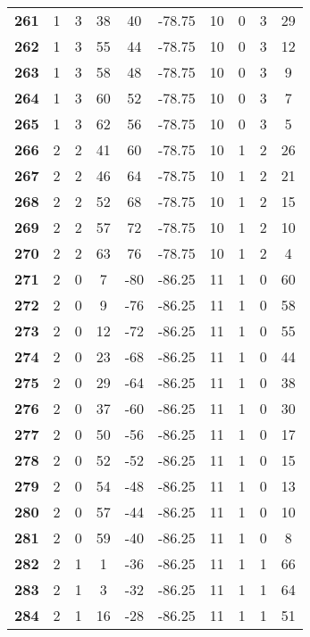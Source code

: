 \documentclass{article}%
\begin{document}
\begin{longtable}{cccccccccc}
        \textbf{261} & 1 & 3 & 38 & 40 & -78.75 & 10 & 0 & 3 & 29 \\ 
        \textbf{262} & 1 & 3 & 55 & 44 & -78.75 & 10 & 0 & 3 & 12 \\ 
        \textbf{263} & 1 & 3 & 58 & 48 & -78.75 & 10 & 0 & 3 & 9 \\ 
        \textbf{264} & 1 & 3 & 60 & 52 & -78.75 & 10 & 0 & 3 & 7 \\ 
        \textbf{265} & 1 & 3 & 62 & 56 & -78.75 & 10 & 0 & 3 & 5 \\ 
        \textbf{266} & 2 & 2 & 41 & 60 & -78.75 & 10 & 1 & 2 & 26 \\ 
        \textbf{267} & 2 & 2 & 46 & 64 & -78.75 & 10 & 1 & 2 & 21 \\ 
        \textbf{268} & 2 & 2 & 52 & 68 & -78.75 & 10 & 1 & 2 & 15 \\ 
        \textbf{269} & 2 & 2 & 57 & 72 & -78.75 & 10 & 1 & 2 & 10 \\ 
        \textbf{270} & 2 & 2 & 63 & 76 & -78.75 & 10 & 1 & 2 & 4 \\ 
        \textbf{271} & 2 & 0 & 7 & -80 & -86.25 & 11 & 1 & 0 & 60 \\ 
        \textbf{272} & 2 & 0 & 9 & -76 & -86.25 & 11 & 1 & 0 & 58 \\ 
        \textbf{273} & 2 & 0 & 12 & -72 & -86.25 & 11 & 1 & 0 & 55 \\ 
        \textbf{274} & 2 & 0 & 23 & -68 & -86.25 & 11 & 1 & 0 & 44 \\ 
        \textbf{275} & 2 & 0 & 29 & -64 & -86.25 & 11 & 1 & 0 & 38 \\ 
        \textbf{276} & 2 & 0 & 37 & -60 & -86.25 & 11 & 1 & 0 & 30 \\ 
        \textbf{277} & 2 & 0 & 50 & -56 & -86.25 & 11 & 1 & 0 & 17 \\ 
        \textbf{278} & 2 & 0 & 52 & -52 & -86.25 & 11 & 1 & 0 & 15 \\ 
        \textbf{279} & 2 & 0 & 54 & -48 & -86.25 & 11 & 1 & 0 & 13 \\ 
        \textbf{280} & 2 & 0 & 57 & -44 & -86.25 & 11 & 1 & 0 & 10 \\ 
        \textbf{281} & 2 & 0 & 59 & -40 & -86.25 & 11 & 1 & 0 & 8 \\ 
        \textbf{282} & 2 & 1 & 1 & -36 & -86.25 & 11 & 1 & 1 & 66 \\ 
        \textbf{283} & 2 & 1 & 3 & -32 & -86.25 & 11 & 1 & 1 & 64 \\ 
        \textbf{284} & 2 & 1 & 16 & -28 & -86.25 & 11 & 1 & 1 & 51 \\ 

\end{longtable}
\end{document}

